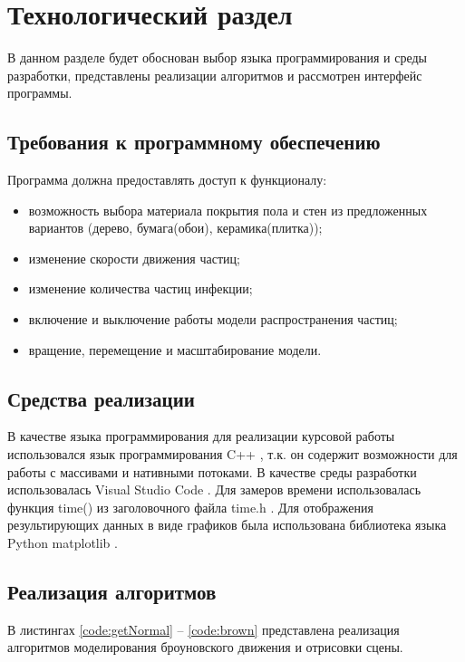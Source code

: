 \chapter{Технологический раздел}
\label{cha:impl}

В данном разделе будет обоснован выбор языка программирования и среды разработки, представлены реализации алгоритмов и рассмотрен интерфейс программы.

\section{Требования к программному обеспечению}

Программа должна предоставлять доступ к функционалу:

\begin{itemize}
	\item возможность выбора материала покрытия пола и стен из предложенных вариантов (дерево, бумага(обои), керамика(плитка));
	\item изменение скорости движения частиц;
	\item изменение количества частиц инфекции;
	\item включение и выключение работы модели распространения частиц;
	\item вращение, перемещение и масштабирование модели.
\end{itemize}

\section{Средства реализации}

В качестве языка программирования для реализации курсовой работы использовался язык программирования C++ \cite{cplusplus}, т.к. он содержит возможности для работы с массивами и нативными потоками. В качестве среды разработки использовалась Visual Studio Code \cite{vscode}. Для замеров времени  использовалась функция time() из заголовочного файла time.h \cite{cplusplus}. Для отображения результирующих данных в виде графиков была использована библиотека языка Python matplotlib \cite{matplotlib}.

\section{Реализация алгоритмов}

В листингах \ref{code:getNormal} -- \ref{code:brown} представлена реализация алгоритмов моделирования броуновского движения и отрисовки сцены.

